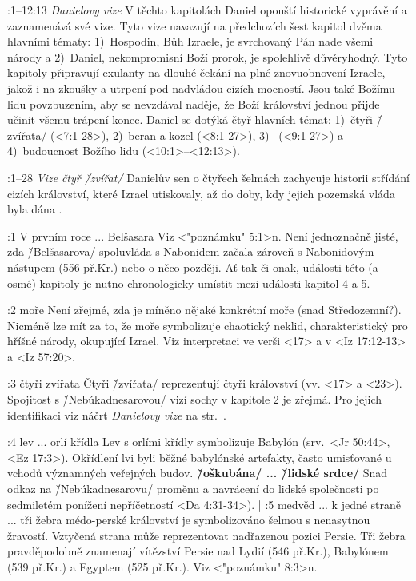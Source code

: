 :1--12:13 {} %
   {\em Danielovy vize} 
     V těchto kapitolách Daniel opouští historické vyprávění
     a zaznamenává své vize. Tyto vize navazují na předchozích šest kapitol dvěma hlavními tématy: 
     1)~Hospodin, Bůh Izraele, je svrchovaný Pán nade všemi národy a 
     2)~Daniel, nekompromisní Boží prorok, je spolehlivě důvěryhodný. Tyto kapitoly připravují exulanty
        na dlouhé čekání na plné znovuobnovení Izraele, jakož i na zkoušky a utrpení pod
        nadvládou cizích mocností. Jsou také Božímu lidu povzbuzením, aby se nevzdával naděje,
        že Boží království jednou přijde učinit všemu trápení konec. Daniel se dotýká čtyř
        hlavních témat: 1)~čtyři \v/zvířata/ (<7:1-28>),  
                        2)~beran a kozel (<8:1-27>),
                        3)~ (<9:1-27>) a 
                        4)~budoucnost Božího lidu (<10:1>--<12:13>).   

:1--28 {}
    {\em Vize čtyř \v/zvířat/}
     Danielův sen o čtyřech šelmách zachycuje historii střídání cizích
     království, které Izrael utiskovaly, až do doby, kdy jejich pozemská vláda byla dána 
     .

:1 {V prvním roce ... Belšasara} %
     Viz <"poznámku" 5:1>n. Není jednoznačně jisté, zda \v/Belšasarova/
     spoluvláda s Nabonidem začala zároveň s Nabonidovým nástupem (556 př.Kr.) nebo o něco
     později. Ať tak či onak, události této (a osmé) kapitoly je nutno chronologicky umístit
     mezi události kapitol 4 a 5. 

:2 {moře} 
     Není zřejmé, zda je míněno nějaké konkrétní moře (snad Středozemní?). Nicméně
     lze mít za to, že moře symbolizuje chaotický neklid, charakteristický pro hříšné národy,
     okupující Izrael. Viz interpretaci ve verši <17> a v <Iz 17:12-13> a <Iz 57:20>. 

:3 {čtyři zvířata}
    Čtyři \v/zvířata/ reprezentují čtyři království (vv. <17> a <23>).
    Spojitost  s \v/Nebúkadnesarovou/ vizí sochy v kapitole 2 je zřejmá. Pro jejich identifikaci viz náčrt 
    {\it Danielovy vize\/} na str.~\pgref[danielovavize]. 

:4 {lev ... orlí křídla} 
     Lev s orlími křídly symbolizuje Babylón (srv.~<Jr 50:44>, <Ez 17:3>).
     Okřídlení lvi byli běžné babylónské artefakty, často umisťované u vchodů významných veřejných budov. 
     {\bf \v/oškubána/ ... \v/lidské srdce/} Snad odkaz na \v/Nebúkadnesarovu/
     proměnu a navrácení do lidské společnosti po sedmiletém ponížení nepříčetností
     <Da 4:31-34>).
|
:5 {medvěd ... k jedné straně ... tři žebra} 
     médo-perské království je symbolizováno šelmou s nenasytnou žravostí. Vztyčená
     strana může reprezentovat nadřazenou pozici Persie. Tři žebra pravděpodobně znamenají
     vítězství Persie nad Lydií (546 př.Kr.), Babylónem (539 př.Kr.) a Egyptem (525 př.Kr.).
     Viz <"poznámku" 8:3>n.

